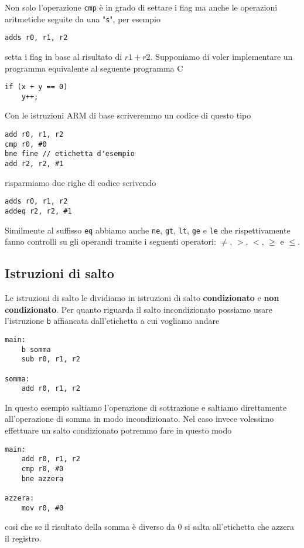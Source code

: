 Non solo l'operazione \verb|cmp| è in grado di settare i flag ma anche le operazioni aritmetiche
seguite da una "\verb|s|", per esempio
\begin{verbatim}
adds r0, r1, r2
\end{verbatim}
setta i flag in base al risultato di $r1 + r2$. Supponiamo di voler implementare un programma
equivalente al seguente programma C
\begin{verbatim}
if (x + y == 0)
	y++;
\end{verbatim}
Con le istruzioni ARM di base scriveremmo un codice di questo tipo
\begin{verbatim}
add r0, r1, r2
cmp r0, #0
bne fine // etichetta d'esempio
add r2, r2, #1
\end{verbatim}
risparmiamo due righe di codice scrivendo
\begin{verbatim}
adds r0, r1, r2
addeq r2, r2, #1
\end{verbatim}
Similmente al suffisso \verb|eq| abbiamo anche \verb|ne|, \verb|gt|, \verb|lt|, \verb|ge| e
\verb|le| che rispettivamente fanno controlli su gli operandi tramite i seguenti operatori:
$\neq$, $>$, $<$, $\geq$ e $\leq$.

\subsection{Istruzioni di salto}
Le istruzioni di salto le dividiamo in istruzioni di salto \textbf{condizionato} e
\textbf{non condizionato}. Per quanto riguarda il salto incondizionato possiamo usare l'istruzione
\verb|b| affiancata dall'etichetta a cui vogliamo andare
\begin{verbatim}
main:
	b somma
	sub r0, r1, r2

somma:
	add r0, r1, r2
\end{verbatim}
In questo esempio saltiamo l'operazione di sottrazione e saltiamo direttamente all'operazione di
somma in modo incondizionato. Nel caso invece volessimo effettuare un salto condizionato potremmo
fare in questo modo
\begin{verbatim}
main:
	add r0, r1, r2
	cmp r0, #0
	bne azzera

azzera:
	mov r0, #0
\end{verbatim}
così che se il risultato della somma è diverso da 0 si salta all'etichetta che azzera il registro.
